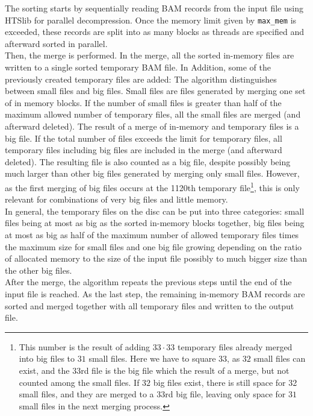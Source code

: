 The sorting starts by sequentially reading BAM records from the input file using HTSlib \cite{htslib} for parallel decompression. Once the memory limit given by \texttt{max\_mem} is exceeded, these records are split into as many blocks as threads are specified and afterward sorted in parallel. \\
Then, the merge is performed. In the merge, all the sorted in-memory files are written to a single sorted temporary BAM file. In Addition, some of the previously created temporary files are added: The algorithm distinguishes between small files and big files. Small files are files generated by merging one set of in memory blocks. If the number of small files is greater than half of the maximum allowed number of temporary files, all the small files are merged (and afterward deleted). The result of a merge of in-memory and temporary files is a big file. If the total number of files exceeds the limit for temporary files, all temporary files including big files are included in the merge (and afterward deleted). The resulting file is also counted as a big file, despite possibly being much larger than other big files generated by merging only small files. However, as the first merging of big files occurs at the 1120th temporary file\footnote{This number is the result of adding $33 \cdot 33$ temporary files already merged into big files to $31$ small files. Here we have to square $33$, as $32$ small files can exist, and the $33$rd file is the big file which the result of a merge, but not counted among the small files. If $32$ big files exist, there is still space for 32 small files, and they are merged to a $33$rd big file, leaving only space for $31$ small files in the next merging process.}, this is only relevant for combinations of very big files and little memory. \\
In general, the temporary files on the disc can be put into three categories: small files being at most as big as the sorted in-memory blocks together, big files being at most as big as half of the maximum number of allowed temporary files times the maximum size for small files and one big file growing depending on the ratio of allocated memory to the size of the input file possibly to much bigger size than the other big files. \\
After the merge, the algorithm repeats the previous steps until the end of the input file is reached. As the last step, the remaining in-memory BAM records are sorted and merged together with all temporary files and written to the output file.